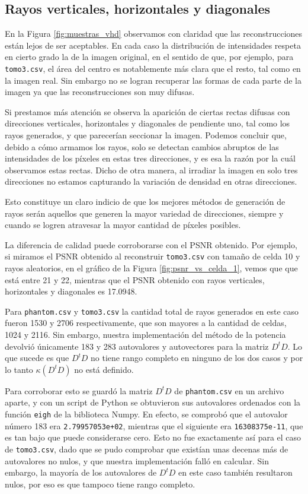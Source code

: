 \documentclass[a4paper]{article}
\begin{document}
\subsection{Rayos verticales, horizontales y diagonales}

En la Figura \ref{fig:muestras_vhd} observamos con claridad que las reconstrucciones están lejos de ser aceptables. En cada caso la distribución de 
intensidades respeta en cierto grado la de la imagen original, en el sentido de que, por ejemplo, para \texttt{tomo3.csv}, el área del centro es 
notablemente más clara que el resto, tal como en la imagen real. Sin embargo no se logran recuperar las formas de cada parte de la imagen ya que 
las reconstrucciones son muy difusas.

Si prestamos más atención se observa la aparición de ciertas rectas difusas con direcciones verticales, horizontales y diagonales de pendiente uno, 
tal como los rayos generados, y que parecerían seccionar la imagen. Podemos concluir que, debido a cómo armamos los rayos, solo se detectan cambios 
abruptos de las intensidades de los píxeles en estas tres direcciones, y es esa la razón por la cuál observamos estas rectas. Dicho de otra manera,
al irradiar la imagen en solo tres direcciones no estamos capturando la variación de densidad en otras direcciones.

Esto constituye un claro indicio de que los mejores métodos de generación de rayos serán aquellos que generen la mayor variedad de direcciones, 
siempre y cuando se logren atravesar la mayor cantidad de píxeles posibles.

La diferencia de calidad puede corroborarse con el PSNR obtenido. Por ejemplo, si miramos el PSNR obtenido al reconstruir \texttt{tomo3.csv} con 
tamaño de celda 10 y rayos aleatorios, en el gráfico de la Figura \ref{fig:psnr_vs_celda_1}, vemos que que está entre 21 y 22, mientras que el 
PSNR obtenido con rayos verticales, horizontales y diagonales es 17.0948.

Para \texttt{phantom.csv} y \texttt{tomo3.csv} la cantidad total de rayos generados en este caso fueron 1530 y 2706 respectivamente, que son mayores 
a la cantidad de celdas, 1024 y 2116. Sin embargo, nuestra implementación del método de la potencia devolvió únicamente 183 y 283 autovalores 
y autovectores para la matriz $D^tD$. Lo que sucede es que $D^tD$ no tiene rango completo en ninguno de los dos casos y por lo tanto $\kappa(D^tD)$ 
no está definido.

Para corroborar esto se guardó la matriz $D^tD$ de \texttt{phantom.csv} en un archivo aparte, y con un script de Python se obtuvieron sus 
autovalores ordenados con la función \texttt{eigh} de la biblioteca Numpy. En efecto, se comprobó que el autovalor número 183 era 
\texttt{2.79957053e+02}, mientras que el siguiente era \texttt{16308375e-11}, que es tan bajo que puede considerarse cero. Esto no fue exactamente 
así para el caso de \texttt{tomo3.csv}, dado que se pudo comprobar que existían unas decenas más de autovalores no nulos, y que nuestra 
implementación falló en calcular. Sin embargo, la mayoría de los autovalores de $D^tD$ en este caso también resultaron nulos, por eso es que tampoco 
tiene rango completo.
\end{document}
